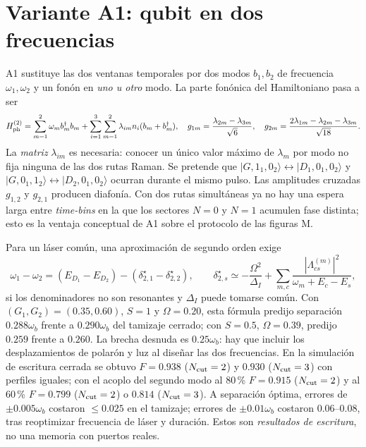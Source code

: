 \documentclass[11pt,a4paper]{article}
\newcommand{\ket}[1]{|#1\rangle}
\newcommand{\wb}{\omega_b}
\begin{document}
\section{Variante A1: qubit en dos frecuencias}\label{sec:A1}
A1 sustituye las dos ventanas temporales por dos modos $b_1,b_2$ de frecuencia
$\omega_1,\omega_2$ y un fonón en \emph{uno u otro} modo. La parte fonónica del
Hamiltoniano pasa a ser
\begin{equation}
H_{\rm ph}^{(2)}=\sum_{m=1}^{2}\omega_m b_m^\dagger b_m+
\sum_{i=1}^{3}\sum_{m=1}^{2}\lambda_{im}n_i(b_m+b_m^\dagger),
\quad
g_{1m}=\frac{\lambda_{2m}-\lambda_{3m}}{\sqrt6},\quad
g_{2m}=\frac{2\lambda_{1m}-\lambda_{2m}-\lambda_{3m}}{\sqrt{18}}.
\label{eq:two_mode}
\end{equation}
La \emph{matriz} $\lambda_{im}$ es necesaria: conocer un único valor máximo de
$\lambda_m$ por modo no fija ninguna de las dos rutas Raman. Se pretende que
$\ket{G,1_1,0_2}\leftrightarrow\ket{D_1,0_1,0_2}$ y
$\ket{G,0_1,1_2}\leftrightarrow\ket{D_2,0_1,0_2}$ ocurran durante el
mismo pulso. Las amplitudes cruzadas $g_{1,2}$ y $g_{2,1}$ producen diafonía.
Con dos rutas simultáneas ya no hay una espera larga entre \emph{time-bins}
en la que los sectores $N=0$ y $N=1$ acumulen fase distinta; esto es la
ventaja conceptual de A1 sobre el protocolo de las figuras M.

Para un láser común, una aproximación de segundo orden exige
\begin{equation}
\omega_1-\omega_2=(E_{D_1}-E_{D_2})-
(\delta_{2,1}^{\star}-\delta_{2,2}^{\star}),\qquad
\delta_{2,s}^{\star}\simeq-\frac{\Omega^2}{\Delta_I}
+\sum_{m,c}\frac{|\Lambda^{(m)}_{cs}|^2}{\omega_m+E_c-E_s},
\label{eq:A1match}
\end{equation}
si los denominadores no son resonantes y $\Delta_I$ puede tomarse común.
Con $(G_1,G_2)=(0.35,0.60)$, $S=1$ y $\Omega=0.20$, esta fórmula
predijo separación $0.288\wb$ frente a $0.290\wb$ del tamizaje cerrado;
con $S=0.5$, $\Omega=0.39$, predijo $0.259$ frente a $0.260$.
La brecha desnuda es $0.25\wb$: hay que incluir los desplazamientos de
polarón y luz al diseñar las dos frecuencias. En la simulación de escritura
cerrada se obtuvo $F=0.938$ ($N_{\rm cut}=2$) y $0.930$ ($N_{\rm cut}=3$) con perfiles iguales; con
el acoplo del segundo modo al $80$\,\% $F=0.915$ ($N_{\rm cut}=2$) y al $60$\,\% $F=0.799$ ($N_{\rm cut}=2$) o $0.814$ ($N_{\rm cut}=3$). A separación óptima, errores de $\pm0.005\wb$ costaron
$\le0.025$ en el tamizaje; errores de $\pm0.01\wb$ costaron
$0.06$--$0.08$, tras reoptimizar frecuencia de láser y duración.
Estos son \emph{resultados de escritura}, no una memoria con puertos reales.
\end{document}
